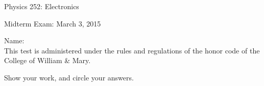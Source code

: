 \documentclass[letterpaper,addpoints]{exam}
\begin{document}
\begin{coverpages}
 \large\bfseries
 
 \noindent 
 Physics 252: Electronics
 
 \vspace{2ex}
 \noindent
 Midterm Exam: March 3, 2015

 \vspace{5ex}
 \noindent 
 Name:\enspace\makebox[2in]{\hrulefill}\\

 \vspace{5ex}
 \noindent 
 This test is administered under the rules and regulations of the honor 
 code of the College of William \& Mary.  

 \vspace{5ex}
 \noindent 
 Show your work, and circle your answers.
 
 \pagebreak
 \vspace{5ex}
 \begin{center}
  \combinedgradetable[v][questions]
 \end{center}
\end{coverpages}
 
\end{document}
